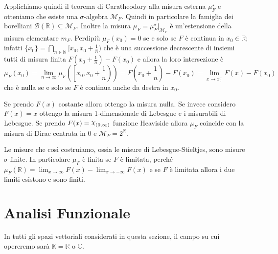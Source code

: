 Applichiamo quindi il teorema di Caratheodory alla misura esterna
\(\mu^\star_F\) e otteniamo che esiste una \(\sigma\)-algebra \(\mathcal{M}_F\).
Quindi in particolare la famiglia dei borelliani \(\mathcal{B}(\mathbb{R})
\subseteq \mathcal{M}_F\). Inoltre la misura \(\mu_F =
\mu^\star_F|_{\mathcal{M}_F}\) è un'estensione della misura elementare \(m_F\).
Perdipiù \(\mu_F{(x_{0})} = 0\) se e solo se \(F\) è continua in \(x_{0} \in
\mathbb{R}\); infatti \(\{x_{0}\} = \bigcap_{n \in \mathbb{N}} [x_{0}, x_{0} +
\frac{1}{n})\) che è una successione decrescente di insiemi tutti di misura
finita \(F{(x_{0} + \frac{1}{n})} - F{(x_{0})}\) e allora la loro intersezione è  
\[
    \mu_F{(x_{0})} = \lim_{n \to \infty} \mu_F{\left(\left[x_{0}, x_{0} +
        \frac{1}{n}\right)\right)} =
    F{\left(x_{0} + \frac{1}{n}\right)} - F{(x_{0})} = \lim_{x \to x_{0}^{+}} F{(x)} -
    F{(x_{0})}
\]
che è nulla se e solo se \(F\) è continua anche da destra in \(x_{0}\).

Se prendo \(F{(x)}\) costante allora ottengo la misura nulla. Se invece
considero \(F{(x)} = x\) ottengo la misura 1-dimensionale di Lebesgue e i misurabili di
Lebesgue. Se prendo \(F{(x)} = \rchi_{(0, \infty)} \) funzione Heaviside allora
\(\mu_F\) coincide con la misura di Dirac centrata in \(0\) e \(\mathcal{M}_F =
2^{\mathbb{R}}\).

Le misure che così costruiamo, ossia le misure di Lebesgue-Stieltjes, sono
misure \(\sigma\)-finite. In particolare \(\mu_F\) è finita se \(F\) è limitata,
perché \(\mu_F{(\mathbb{R})} = \lim_{x \to \infty} F{(x)} - \lim_{x \to -\infty}
F{(x)}\) e se \(F\) è limitata allora i due limiti esistono e sono finiti.

\newpage
\section{Analisi Funzionale}
In tutti gli spazi vettoriali considerati in questa sezione, il campo su cui
opereremo sarà \(\mathbb{K} = \mathbb{R}\) o \(\mathbb{C}\).
